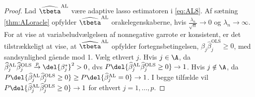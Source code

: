 \begin{proof}
Lad \(\widehat{\tbeta}^\text{AL}\) være adaptive lasso estimatoren i \eqref{eq:AL8}.
Af sætning \ref{thm:ALoracle} opfylder \(\widehat{\tbeta}^\text{AL}\) orakelegenskaberne, hvis \(\frac{\lambda_n}{\sqrt{n}} \rightarrow 0\) og \(\lambda_n \rightarrow \infty\).
For at vise at variabeludvælgelsen af nonnegative garrote er konsistent, er det tilstrækkeligt at vise, at \(\widehat{\tbeta}^\text{AL}\) opfylder fortegnsbetingelsen, \(\beta_j \widehat{\beta}_j^\text{OLS} \geq 0 \), med sandsynlighed gående mod 1.
Vælg ethvert \(j\).
Hvis \(j \in \A\), da \(\widehat{\beta}_j^\text{AL} \widehat{\beta}_j^\text{OLS} \overset{p}{\rightarrow} \del{\beta_j^*}^2 > 0\), dvs \(P \del{\widehat{\beta}_j^\text{AL} \widehat{\beta}_j^\text{OLS} \geq 0} \rightarrow 1\).
Hvis \(j \notin \A\), da \(P \del{\widehat{\beta}_j^\text{AL} \widehat{\beta}_j^\text{OLS} \geq 0} \geq P \del{\widehat{\beta}_j^\text{AL} = 0} \rightarrow 1\).
I begge tilfælde vil \(P \del{\widehat{\beta}_j^\text{AL} \widehat{\beta}_j^\text{OLS} \geq 0} \rightarrow 1\) for ethvert \(j = 1, \ldots, p\).
\end{proof}